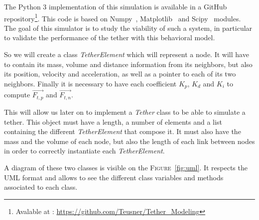 The Python 3 implementation of this simulation is available in a GitHub repository\footnote{Avalable at : \url{https://github.com/Teusner/Tether\_Modeling}}. This code is based on Numpy~\cite{numpy}, Matplotlib~\cite{matplotlib} and Scipy~\cite{scipy} modules. The goal of this simulator is to study the viability of such a system, in particular to validate the performance of the tether with this behavioral model.

So we will create a class \textit{TetherElement} which will represent a node. It will have to contain its mass, volume and distance information from its neighbors, but also its position, velocity and acceleration, as well as a pointer to each of its two neighbors. Finally it is necessary to have each coefficient $K_p$, $K_d$ and $K_i$ to compute $\overrightarrow{F_{t, p}}$ and $\overrightarrow{F_{t, n}}$.

This will allow us later on to implement a \textit{Tether} class to be able to simulate a tether. This object must have a length, a number of elements and a list containing the different \textit{TetherElement} that compose it. It must also have the mass and the volume of each node, but also the length of each link between nodes in order to correctly instantiate each \textit{TetherElement}.

A diagram of these two classes is visible on the \textsc{Figure}~\ref{fig:uml}. It respects the \textsc{UML} format and allows to see the different class variables and methods associated to each class.

